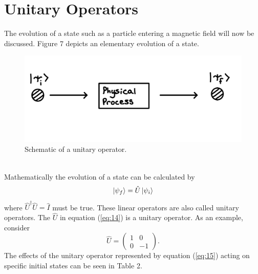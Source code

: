 \documentclass[twocolumn]{article}
\begin{document}
\section*{Unitary Operators}
The evolution of a state such as a particle entering a magnetic field will now be discussed. Figure 7 depicts an elementary evolution of a state.
\begin{figure}[htpb]
\begin{center}
\includegraphics[width=0.90\linewidth]{Unitary-Operator.PNG}
\caption{Schematic of a unitary operator.}
\end{center}
\end{figure}\\
Mathematically the evolution of a state can be calculated by
\begin{equation}\label{eq:14}
\ket{\psi_f}=\hat{U}\ket{\psi_i}
\end{equation}
where $\hat{U}^{\dagger}\hat{U}=\hat{I}$ must be true. These linear operators are also called unitary operators.  The $\hat{U}$ in equation (\ref{eq:14}) is a unitary operator. As an example, consider 
\begin{equation}\label{eq:15}
\hat{U}=
\begin{pmatrix}
1 & 0 \\
0 & -1
\end{pmatrix}.
\end{equation}
The effects of the unitary operator represented by equation (\ref{eq:15}) acting on specific initial states can be seen in Table 2.
\end{document}
